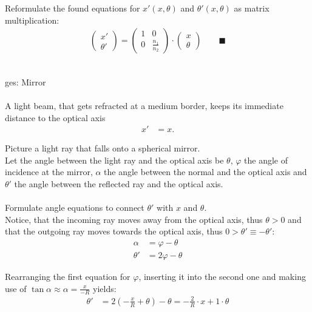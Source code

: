 \documentclass{article}
\newcommand{\lr}[1]{\left(#1\right)}
\begin{document}
{	Reformulate the found equations for $x'(x,\theta)$ and $\theta'(x,\theta)$ as matrix multiplication:
		\begin{align*}
			\begin{pmatrix}
				x' \\ \theta'
			\end{pmatrix}
			=
			\begin{pmatrix}
				1 & 0 \\
				0 & \frac{n_1}{n_2}
			\end{pmatrix}
			\cdot
			\begin{pmatrix}
				x \\ \theta
			\end{pmatrix}
			\qquad \blacksquare
		\end{align*}


	\\
	ges: Mirror\\
	\\
	A light beam, that gets refracted at a medium border, keeps its immediate distance to the optical axis
		\begin{align*}
			x' &= x.
		\end{align*}
	

\newpage


	Picture a light ray that falls onto a spherical mirror.\\
	Let the angle between the light ray and the optical axis be $\theta$, $\varphi$ the angle of incidence at the mirror, $\alpha$ the angle between the normal and the optical axis and $\theta'$ the angle between the reflected ray and the optical axis.\\
	\\
	Formulate angle equations to connect $\theta'$ with $x$ and $\theta$.\\
	Notice, that the incoming ray moves away from the optical axis, thus $\theta > 0$ and that the outgoing ray moves towards the optical axis, thus $0>\theta' \equiv -\theta'$:
		\begin{align*}
			\alpha &= \varphi - \theta \\
			\theta' &= 2\varphi - \theta
		\end{align*}
	
	Rearranging the first equation for $\varphi$, inserting it into the second one and making use of $\tan\alpha \approx \alpha = \frac{x}{-R}$ yields:
		\begin{align*}
			\theta' &= 2\lr{ -\frac{x}{R} + \theta } - \theta = -\frac{2}{R} \cdot x + 1 \cdot \theta
		\end{align*}

}
\end{document}
